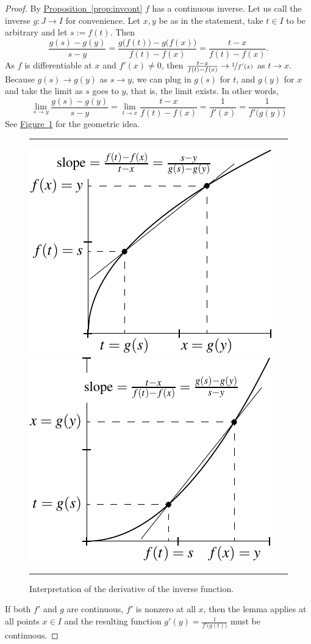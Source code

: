 \documentclass[12pt]{book}
\newenvironment{myfigureht}{%
\begin{figure}[h!t]
\noindent\rule{\textwidth}{0.4pt}\vspace{12pt}\par\centering}%
{\par\noindent\rule{\textwidth}{0.4pt}
\end{figure}}
\theoremstyle{plain}
\theoremstyle{remark}
\theoremstyle{definition}
\theoremstyle{exercise}
\theoremstyle{example}
\newcommand{\figureref}[1]{\hyperref[#1]{Figure~\ref*{#1}}}
\newcommand{\propref}[1]{\hyperref[#1]{Proposition~\ref*{#1}}}
\begin{document}
\begin{proof}
By \propref{prop:invcont} $f$ has a continuous inverse.  Let us
call the inverse $g \colon J \to I$ for convenience.
Let $x,y$ be as in the statement, take $t \in I$ to be arbitrary
and let $s := f(t)$.
Then
\begin{equation*}
\frac{g(s)-g(y)}{s-y} =
\frac{g\bigl(f(t)\bigr)-g\bigl(f(x)\bigr)}{f(t)-f(x)} =
\frac{t-x}{f(t)-f(x)} .
\end{equation*}
As $f$ is differentiable at $x$ and $f'(x) \not= 0$, then 
$\frac{t-x}{f(t)-f(x)} \to \nicefrac{1}{f'(x)}$ as $t \to x$.
Because $g(s) \to g(y)$ as $s \to y$, we 
can plug in $g(s)$ for $t$, and $g(y)$ for $x$ and take the limit
as $s$ goes to $y$, that is, the limit exists.  In other words,
\begin{equation*}
\lim_{s \to y}
\frac{g(s)-g(y)}{s-y} 
=
\lim_{t \to x} \frac{t-x}{f(t)-f(x)} 
=
\frac{1}{f'(x)} 
=
\frac{1}{f'\bigl(g(y)\bigr)}
\end{equation*}
See \figureref{inversefig} for the geometric idea.
\begin{myfigureht}
\includegraphics{figures/inversefigA}
\quad
\includegraphics{figures/inversefigB}
\caption{Interpretation of the derivative of the inverse
function.\label{inversefig}}
\end{myfigureht}

If both $f'$ and $g$ are continuous, $f'$ is nonzero at all $x$,
then the lemma applies at all points $x \in I$ and the resulting function $g'(y) =
\frac{1}{f'\bigl(g(t)\bigr)}$ must be continuous.
\end{proof}
\end{document}
